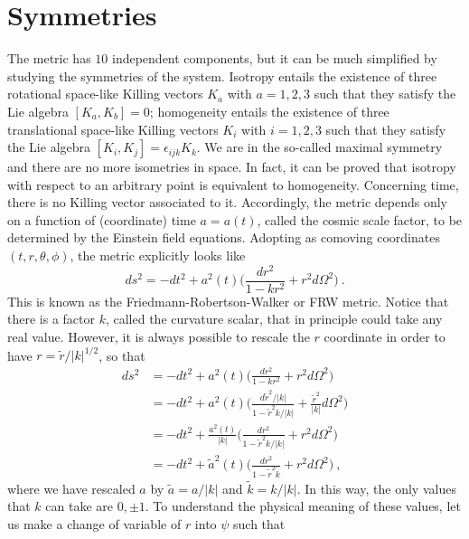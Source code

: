 \section{Symmetries}

    The metric has $10$ independent components, but it can be much simplified by studying the symmetries of the system. Isotropy entails the existence of three rotational space-like Killing vectors $K_a$ with $a=1,2,3$ such that they satisfy the Lie algebra $[K_a, K_b] = 0$; homogeneity entails the existence of three translational space-like Killing vectors $K_i$ with $i=1,2,3$ such that they satisfy the Lie algebra $[K_i, K_j] = \epsilon_{ijk} K_k$. We are in the so-called maximal symmetry and there are no more isometries in space. In fact, it can be proved that isotropy with respect to an arbitrary point is equivalent to homogeneity. Concerning time, there is no Killing vector associated to it. Accordingly, the metric depends only on a function of (coordinate) time $a=a(t)$, called the cosmic scale factor, to be determined by the Einstein field equations. Adopting as comoving coordinates $(t, r, \theta, \phi)$, the metric explicitly looks like 
    \begin{equation*}
        ds^2 = - dt^2 + a^2 (t) \Big ( \frac{dr^2}{1 - k r^2} + r^2 d\Omega^2 \Big ) ~.
    \end{equation*}
    This is known as the Friedmann-Robertson-Walker or FRW metric. Notice that there is a factor $k$, called the curvature scalar, that in principle could take any real value. However, it is always possible to rescale the $r$ coordinate in order to have $r = \tilde r / |k|^{1/2}$, so that 
    \begin{equation*}
    \begin{aligned}
        ds^2 & = - dt^2 + a^2 (t) \Big ( \frac{d r^2}{1 - k r^2} + r^2 d\Omega^2 \Big ) \\ & = - dt^2 + a^2 (t) \Big ( \frac{d \tilde r^2 / |k|}{1 - \tilde r^2 k / |k|} + \frac{\tilde r^2}{|k|} d\Omega^2 \Big ) \\ & = - dt^2 + \frac{a^2 (t)}{|k|} \Big ( \frac{d r^2}{1 - \tilde r^2 k / |k|} + r^2 d\Omega^2 \Big ) \\ & = - dt^2 + \tilde a^2 (t) \Big ( \frac{d r^2}{1 - \tilde r^2 \tilde k} + r^2 d\Omega^2 \Big ) ~,
    \end{aligned}
    \end{equation*}
    where we have rescaled $a$ by $\tilde a = a / |k|$ and $\tilde k = k / |k|$. In this way, the only values that $k$ can take are $0, \pm 1$. To understand the physical meaning of these values, let us make a change of variable of $r$ into $\psi$ such that 

